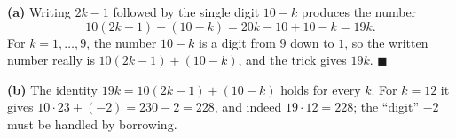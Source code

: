 \textbf{(a)} Writing $2k-1$ followed by the single digit $10-k$ produces the number
\[10(2k-1)+(10-k)=20k-10+10-k=19k.\]
For $k=1,\dots,9$, the number $10-k$ is a digit from $9$ down to $1$, so the written number really is $10(2k-1)+(10-k)$, and the trick gives $19k$. $\blacksquare$

\textbf{(b)} The identity $19k=10(2k-1)+(10-k)$ holds for every $k$. For $k=12$ it gives $10\cdot23+(-2)=230-2=228$, and indeed $19\cdot12=\boxed{228}$; the ``digit'' $-2$ must be handled by borrowing.

